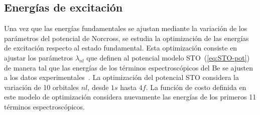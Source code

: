 \begin{comment}
Los resultados de la mejor optimización 
bayesiana de $\alpha_l$ y $\rho_l$ se muestran en la 
Fig.~\ref{fig:globmin}. En el panel superior se presenta la evaluación 
de la función de costo a medida que los procesos gaussianos exploran la
superficie hiper-dimensional de la función de costo. Cada uno de estos 
puntos se corresponde a un punto del espacio de parámetros, que se 
muestra en el panel inferior. El mínimo de la función de costo vecinos es 
hallado en la iteración 81; este punto y sus vecinos más cercanos 
($J\leq 0.245$) se muestran con símbolos de color negro. Los parámetros 
que le corresponden a dichas evaluaciones también se muestran en la parte
inferior con símbolos de color negro.

\begin{figure}
\centering
\texttt{[image: figures/rmatrix/Jpol\_globmin.pdf]}
\texttt{[image: figures/rmatrix/params\_globmin.pdf]}
\caption[Minimización de la función de costo y exploración de parámetros.]
{(Panel superior) Optimización bayesiana de la función de costo dada por 
la ecuación~(\ref{eq:Jpol}). (Panel inferior) Exploración del 
hiper-espacio de parámetros correspondiente.}
\label{fig:globmin}
\end{figure}
\end{comment}


\subsection{Energías de excitación}

Una vez que las energías fundamentales se ajustan mediante la variación 
de los parámetros del potencial de Norcross, se estudia la optimización 
de las energías de excitación respecto al estado fundamental. Esta 
optimización consiste en ajustar los parámetros $\lambda_{nl}$ que 
definen al potencial modelo STO~(\ref{eq:STO-pot}) de manera tal que las 
energías de los términos espectroscópicos del Be se ajusten a los datos 
experimentales~\cite{NIST}. 
La optimización del potencial STO considera la variación de 10 orbitales 
$nl$, desde $1s$ hasta $4f$. La función de costo definida en este modelo 
de optimización considera nuevamente las energías de los primeros 11 
términos espectroscópicos. 

